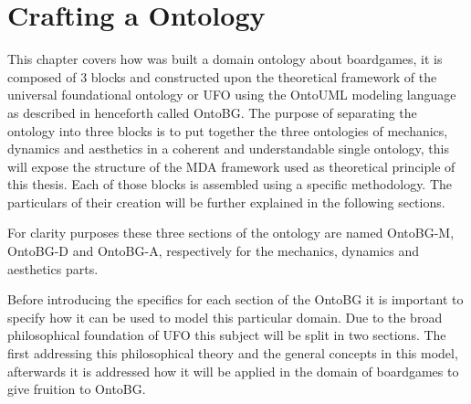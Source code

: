 \chapter{Crafting a Ontology}
This chapter covers how was built a domain ontology about boardgames, it is composed of 3 blocks and constructed upon the theoretical framework of the universal foundational ontology or UFO \citep{guizzardi_ontological_2005} using the OntoUML modeling language as described in \cite{guizzardi_ontological_2005,guizzardi_ontoUML_2004,guizzardi2015towards} henceforth called OntoBG. The purpose of separating the ontology into three blocks is to put together the three ontologies of mechanics, dynamics and aesthetics in a coherent and understandable single ontology, this will expose the structure of the MDA framework used as theoretical principle of this thesis. Each of those blocks is assembled using a specific methodology. The particulars of their creation will be further explained in the following sections.

For clarity purposes these three sections of the ontology are named OntoBG-M, OntoBG-D and OntoBG-A, respectively for the mechanics, dynamics and aesthetics parts.

Before introducing the specifics for each section of the OntoBG it is important to specify how it can be used to model this particular domain. Due to the broad philosophical foundation of UFO this subject will be split in two sections. The first addressing this philosophical theory and the general concepts in this model, afterwards it is addressed how it will be applied in the domain of boardgames to give fruition to OntoBG.











